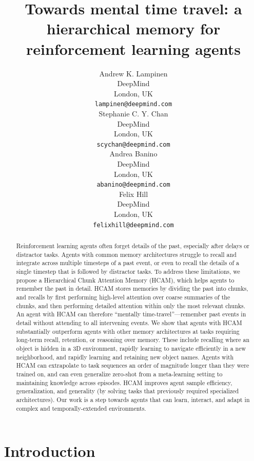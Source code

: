 \documentclass{article}
\title{Towards mental time travel: a hierarchical memory for reinforcement learning agents}
\date{}
\author{%
  Andrew K. Lampinen\\
  DeepMind\\
  London, UK\\
  \texttt{lampinen@deepmind.com} \\
  \And
  Stephanie C. Y. Chan\\
  DeepMind\\
  London, UK\\
  \texttt{scychan@deepmind.com} \\
  \And
  Andrea Banino\\
  DeepMind\\
  London, UK\\
  \texttt{abanino@deepmind.com} \\
  \And
  Felix Hill\\
  DeepMind\\
  London, UK\\
  \texttt{felixhill@deepmind.com} \\
}
\begin{document}
\maketitle

\begin{abstract}
Reinforcement learning agents often forget details of the past, especially after delays or distractor tasks. Agents with common memory architectures struggle to recall and integrate across multiple timesteps of a past event, or even to recall the details of a single timestep that is followed by distractor tasks. To address these limitations, we propose a Hierarchical Chunk Attention Memory (HCAM), which helps agents to remember the past in detail. HCAM stores memories by dividing the past into chunks, and recalls by first performing high-level attention over coarse summaries of the chunks, and then performing detailed attention within only the most relevant chunks. An agent with HCAM can therefore ``mentally time-travel''---remember past events in detail without attending to all intervening events. We show that agents with HCAM substantially outperform agents with other memory architectures at tasks requiring long-term recall, retention, or reasoning over memory. These include recalling where an object is hidden in a 3D environment, rapidly learning to navigate efficiently in a new neighborhood, and rapidly learning and retaining new object names. Agents with HCAM can extrapolate to task sequences an order of magnitude longer than they were trained on, and can even generalize zero-shot from a meta-learning setting to maintaining knowledge across episodes. HCAM improves agent sample efficiency, generalization, and generality (by solving tasks that previously required specialized architectures). Our work is a step towards agents that can learn, interact, and adapt in complex and temporally-extended environments.
\end{abstract}

\section{Introduction}
\end{document}
